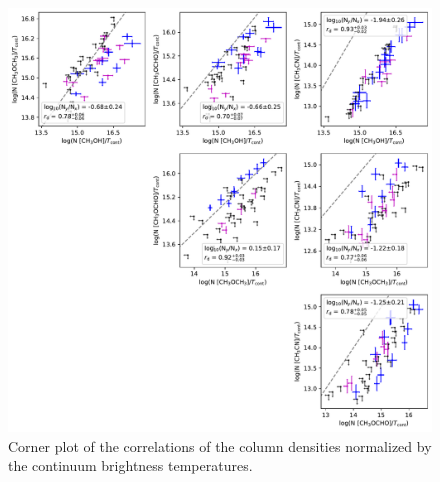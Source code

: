 \documentclass[twocolumn]{aastex62}
\begin{document}
\renewcommand{\thefigure}{\arabic{figure} (Cont.)}
\addtocounter{figure}{-1}
\begin{figure}[htbp!]
  \centering
  \includegraphics[width=\textwidth]{corner_Ncol_correlations_norm_Tcont.pdf}
  \caption{Corner plot of the correlations of the column densities normalized by the continuum brightness temperatures.}
  \label{fig:corner_tcont}
\end{figure}
\end{document}
